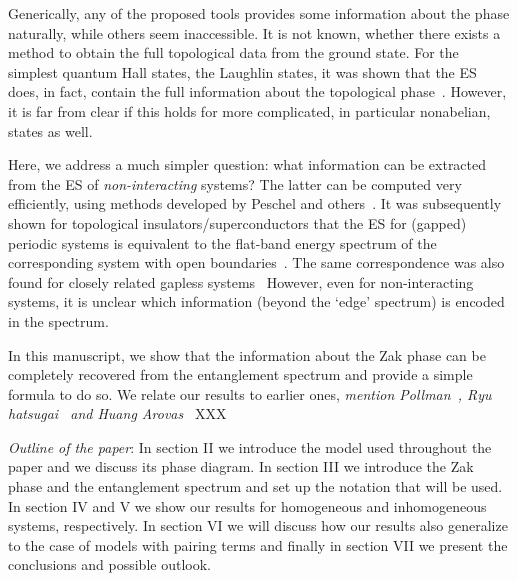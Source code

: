 \documentclass[twocolumn,amsmath,longbibliography,amssymb,superscriptaddress]{revtex4-1}
\newcommand{\mariac}[1]{{\it\color{cyan}#1}}
\begin{document}
Generically, any of the proposed tools provides some information about the phase naturally, while others seem inaccessible. 
It is not known, whether there exists a method to obtain the full topological data from the ground state. 
For the simplest quantum Hall states, the Laughlin states,  it was shown that the ES does, in fact, contain the full information about the topological phase~\cite{hermanns2011haldane}.
However, it is far from clear if this holds for more complicated, in particular nonabelian, states as well.  

Here, we address a much simpler question: what information can be extracted from the ES of \emph{non-interacting} systems?
The latter can be computed very efficiently, using methods developed by Peschel and others~\cite{Peschel2003}. 
It was subsequently shown for topological insulators/superconductors that the ES for (gapped) periodic systems is equivalent to the flat-band energy spectrum of the corresponding system with open boundaries~\cite{Fidkowski2010entanglement}. 
The same correspondence was also found for closely related gapless systems~\cite{Matern2018entanglement}
However, even for non-interacting systems, it is unclear which information (beyond the  `edge' spectrum) is encoded in the spectrum. 

In this manuscript, we show that the information about the Zak phase can be completely recovered from the entanglement spectrum and provide a simple formula to do so. 
We relate our results to earlier ones, \mariac{mention Pollman~\cite{Zaletel2014}, Ryu hatsugai~\cite{Ryu2006} and Huang Arovas~\cite{Huang2012,Huang2012-2}} XXX

\emph{Outline of the paper}: In section II we introduce the model used throughout the paper and we discuss its phase diagram. In section III we introduce the Zak phase and the entanglement spectrum and set up the notation that will be used. In section IV and V we show our results for homogeneous and inhomogeneous systems, respectively. In section VI we will discuss how our results also generalize to the case of models with pairing terms and finally in section VII we present the conclusions and possible outlook.

\end{document}

